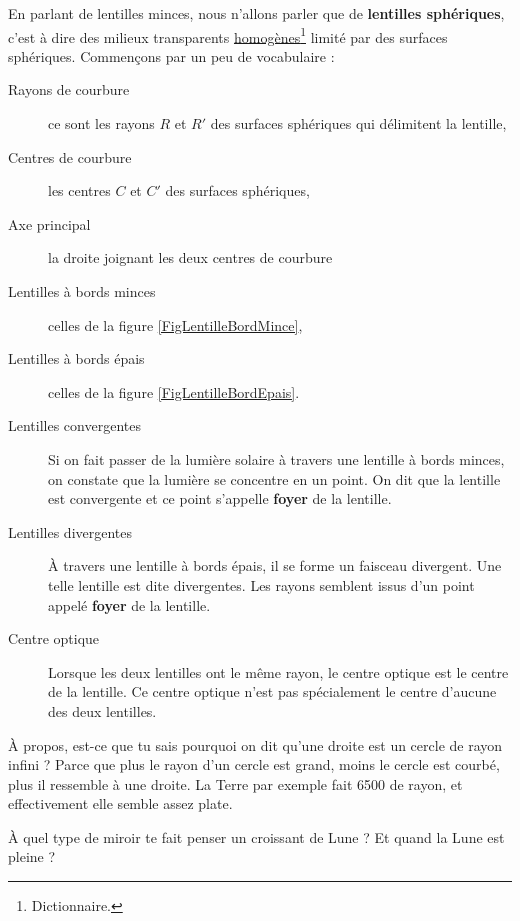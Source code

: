 \documentclass[a4paper,12pt]{book}
\theoremstyle{mes_exemples}	\newtheorem{exemple}[numtho]{Exemple}
\theoremstyle{mes_tho}
\newcommand{\defe}[2]{\textbf{#1}\index{#2}}
\begin{document}
En parlant de lentilles minces, nous n'allons parler que de \defe{lentilles sphériques}{}, c'est à dire des milieux transparents \href{http://fr.wikipedia.org/wiki/Homogène}{homogènes}\footnote{Dictionnaire.} limité par des surfaces sphériques. Commençons par un peu de vocabulaire :
\begin{description}
\item[Rayons de courbure] ce sont les rayons $R$ et $R'$ des surfaces sphériques qui délimitent la lentille,
\item[Centres de courbure] les centres $C$ et $C'$ des surfaces sphériques,
\item[Axe principal] la droite joignant les deux centres de courbure
\item[Lentilles à bords minces] celles de la figure \ref{FigLentilleBordMince},
\item[Lentilles à bords épais] celles de la figure \ref{FigLentilleBordEpais}.
\item[Lentilles convergentes]  Si on fait passer de la lumière solaire à travers une lentille à bords minces, on constate que la lumière se concentre en un point. On dit que la lentille est convergente et ce point s'appelle \defe{foyer}{} de la lentille.
\item[Lentilles divergentes] À travers une lentille à bords épais, il se forme un faisceau divergent. Une telle lentille est dite divergentes. Les rayons semblent issus d'un point appelé \defe{foyer}{} de la lentille.
\item[Centre optique] Lorsque les deux lentilles ont le même rayon, le centre optique est le centre de la lentille. Ce centre optique n'est pas spécialement le centre d'aucune des deux lentilles.
\end{description}

À propos, est-ce que tu sais pourquoi on dit qu'une droite est un cercle de rayon infini ? Parce que plus le rayon d'un cercle est grand, moins le cercle est courbé, plus il ressemble à une droite. La Terre par exemple fait \unit{6500}{\kilo\meter} de rayon, et effectivement elle semble assez plate. 

\begin{exercice}
À quel type de miroir te fait penser un croissant de Lune ? Et quand la Lune est pleine ?
\end{exercice}
\end{document}
